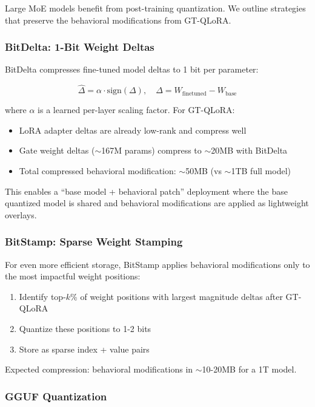 \documentclass[11pt,a4paper]{article}
\begin{document}
Large MoE models benefit from post-training quantization. We outline strategies that preserve the behavioral modifications from GT-QLoRA.

\subsubsection{BitDelta: 1-Bit Weight Deltas}

BitDelta \citep{liu2024bitdelta} compresses fine-tuned model deltas to 1 bit per parameter:

$$\hat{\Delta} = \alpha \cdot \text{sign}(\Delta), \quad \Delta = W_{\text{finetuned}} - W_{\text{base}}$$

where $\alpha$ is a learned per-layer scaling factor. For GT-QLoRA:
\begin{itemize}
    \item LoRA adapter deltas are already low-rank and compress well
    \item Gate weight deltas ($\sim$167M params) compress to $\sim$20MB with BitDelta
    \item Total compressed behavioral modification: $\sim$50MB (vs $\sim$1TB full model)
\end{itemize}

This enables a ``base model + behavioral patch'' deployment where the base quantized model is shared and behavioral modifications are applied as lightweight overlays.

\subsubsection{BitStamp: Sparse Weight Stamping}

For even more efficient storage, BitStamp applies behavioral modifications only to the most impactful weight positions:

\begin{enumerate}
    \item Identify top-$k$\% of weight positions with largest magnitude deltas after GT-QLoRA
    \item Quantize these positions to 1-2 bits
    \item Store as sparse index + value pairs
\end{enumerate}

Expected compression: behavioral modifications in $\sim$10-20MB for a 1T model.

\subsubsection{GGUF Quantization}
\end{document}
